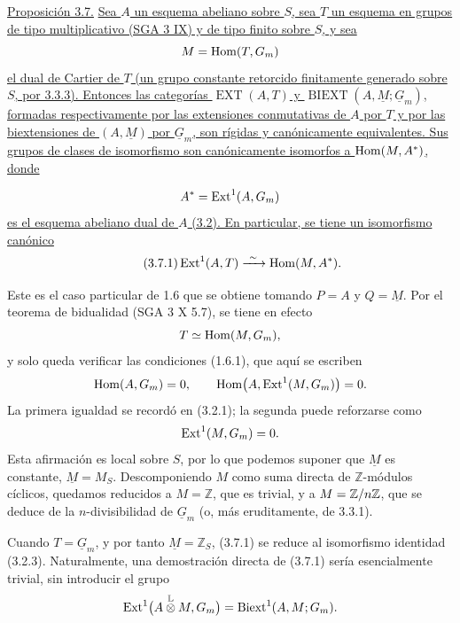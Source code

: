 \medskip
\noindent\underline{Proposición 3.7.} \underline{Sea $A$ un esquema
abeliano sobre $S$, sea $T$ un esquema en grupos de tipo multiplicativo
(SGA 3 IX) y de tipo finito sobre $S$, y sea}
\[
 \underline M=\uHom(T,\underline G_m)
\]
\underline{el dual de Cartier de $T$ (un grupo constante retorcido
finitamente generado sobre $S$, por 3.3.3). Entonces las categorías
$\operatorname{EXT}(A,T)$ y
$\operatorname{BIEXT}(A,\underline M;\underline G_m)$, formadas
respectivamente por las extensiones conmutativas de $A$ por $T$ y por
las biextensiones de $(A,\underline M)$ por $\underline G_m$, son
rígidas y canónicamente equivalentes. Sus grupos de clases de
isomorfismo son canónicamente isomorfos a $\Hom(\underline M,A^*)$,
donde}


\[
 A^*=\uExt^1(A,\underline G_m)
\]
\underline{es el esquema abeliano dual de $A$ (3.2). En particular,
se tiene un isomorfismo canónico}
\begin{equation}\tag{3.7.1}
 \Ext^1(A,T)\xrightarrow{\ \sim\ }
 \Hom(\underline M,A^*).
\end{equation}

Este es el caso particular de 1.6 que se obtiene tomando $P=A$ y
$Q=\underline M$. Por el teorema de bidualidad (SGA 3 X 5.7), se
tiene en efecto
\[
 T\simeq\uHom(\underline M,\underline G_m),
\]
y solo queda verificar las condiciones (1.6.1), que aquí se escriben
\[
 \uHom(A,\underline G_m)=0,
 \qquad
 \Hom\bigl(A,\uExt^1(\underline M,\underline G_m)\bigr)=0.
\]
La primera igualdad se recordó en (3.2.1); la segunda puede reforzarse
como
\[
 \uExt^1(\underline M,\underline G_m)=0.
\]
Esta afirmación es local sobre $S$, por lo que podemos suponer que
$\underline M$ es constante, $\underline M=M_S$. Descomponiendo $M$
como suma directa de $\mathbb Z$-módulos cíclicos, quedamos reducidos a
$M=\mathbb Z$, que es trivial, y a
$\sisi{\mathbb Z}{M}=\mathbb Z/n\mathbb Z$, que se deduce de la
$n$-divisibilidad de $\underline G_m$ (o, más eruditamente, de 3.3.1).

Cuando $T=\underline G_m$, y por tanto
$\underline M=\mathbb Z_S$, (3.7.1) se reduce al isomorfismo identidad
(3.2.3). Naturalmente, una demostración directa de (3.7.1) sería
esencialmente trivial, sin introducir el grupo
\[
 \Ext^1\bigl(A\mathbin{\mathop{\otimes}^{\mathbb L}}\underline M,
              \underline G_m\bigr)
 =\Biext^1(A,\underline M;\underline G_m).
\]
